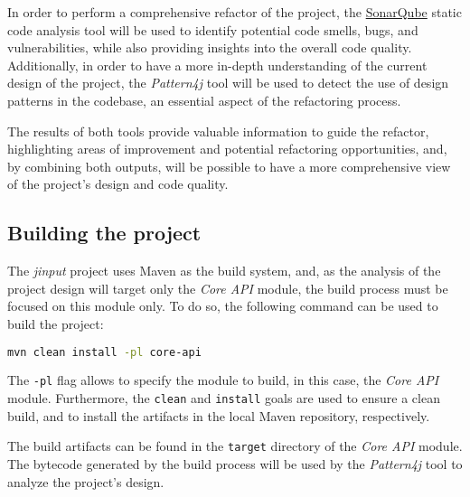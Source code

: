 In order to perform a comprehensive refactor of the project, the \href{https://www.sonarsource.com/}{SonarQube} static code analysis tool will be used to identify potential code smells, bugs, and vulnerabilities, while also providing insights into the overall code quality. Additionally, in order to have a more in-depth understanding of the current design of the project, the \textit{Pattern4j} tool will be used to detect the use of design patterns in the codebase, an essential aspect of the refactoring process.

The results of both tools provide valuable information to guide the refactor, highlighting areas of improvement and potential refactoring opportunities, and, by combining both outputs, will be possible to have a more comprehensive view of the project's design and code quality.

\subsection{Building the project}

The \emph{jinput} project uses Maven as the build system, and, as the analysis of the project design will target only the \emph{Core API} module, the build process must be focused on this module only. To do so, the following command can be used to build the project:

\begin{center}
	\begin{minipage}{0.5\textwidth}
		\begin{lstlisting}[language=bash, caption={Building the project using Maven}]
    mvn clean install -pl core-api
  \end{lstlisting}
	\end{minipage}
\end{center}

The \texttt{-pl} flag allows to specify the module to build, in this case, the \emph{Core API} module. Furthermore, the \texttt{clean} and \texttt{install} goals are used to ensure a clean build, and to install the artifacts in the local Maven repository, respectively.

The build artifacts can be found in the \texttt{target} directory of the \emph{Core API} module. The bytecode generated by the build process will be used by the \textit{Pattern4j} tool to analyze the project's design.
